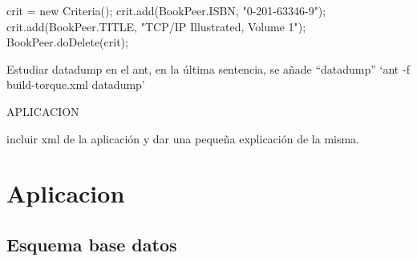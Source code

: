 \documentclass[12pt, oneside]{article}
\begin{document}
crit = new Criteria();
crit.add(BookPeer.ISBN, "0-201-63346-9");
crit.add(BookPeer.TITLE, "TCP/IP Illustrated, Volume 1");
BookPeer.doDelete(crit);







Estudiar datadump
en el ant, en la última sentencia, se añade “datadump” 
‘ant -f build-torque.xml datadump’













APLICACION

incluir xml de la aplicación y dar una pequeña explicación de la misma.

\section{Aplicacion}
\subsection{Esquema base datos}

\end{document}
